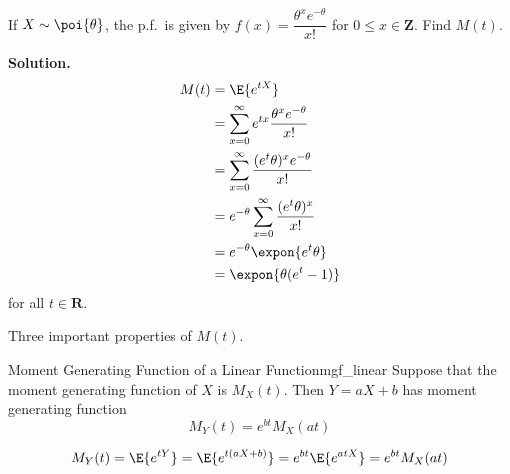 \begin{Example}{}{}
    If $ X \sim \poi{\theta} $, the p.f.\ is given by
    $ f(x)=\dfrac{\theta^x e^{-\theta}}{x!} $
    for $ 0\le x\in\mathbf{Z} $. Find $ M(t) $.

    \textbf{Solution.}
    \begin{align*}
        M(t)
         & =\E{e^{tX}}                                                        \\
         & =\sum\limits_{x=0}^{\infty} e^{tx} \frac{\theta^x e^{-\theta}}{x!} \\
         & =\sum\limits_{x=0}^{\infty} \frac{(e^t \theta)^x e^{-\theta}}{x!}  \\
         & =e^{-\theta}\sum\limits_{x=0}^{\infty} \frac{(e^t \theta)^x}{x!}   \\
         & =e^{-\theta} \expon{e^t \theta}                                    \\
         & =\expon{\theta(e^t-1)}
    \end{align*}
    for all $ t\in\mathbf{R} $.
\end{Example}
Three important properties of $ M(t) $.

\begin{Theorem}{Moment Generating Function of a Linear Function}{mgf_linear}
    Suppose that the moment generating function of $ X $ is $ M_X(t) $.
    Then $ Y=aX+b $ has moment generating function
    \[ M_Y(t)=e^{bt}M_X(at) \]
\end{Theorem}

\begin{Proof}{}{}
    \[  M_Y(t)
        =\E{e^{tY}}
        =\E{e^{t(aX+b)}}
        =e^{bt}\E{e^{atX}}
        =e^{bt}M_X(at) \]
\end{Proof}

